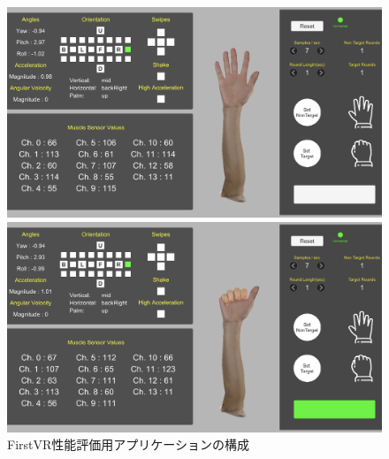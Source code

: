 \documentclass{ltjsreport}
\begin{document}
		\begin{figure}[H]
		\centering
		\begin{minipage}{0.75\columnwidth}
		\centering
		\includegraphics[width = \columnwidth]{../figs/IMG_1866.PNG}
		\end{minipage}
		\hspace{0.04\columnwidth}
		\begin{minipage}{0.75\columnwidth}
		\centering
		\includegraphics[width = \columnwidth]{../figs/IMG_1867.PNG}
		\end{minipage}
		\caption{FirstVR性能評価用アプリケーションの構成}
		\end{figure}

		
\end{document}
